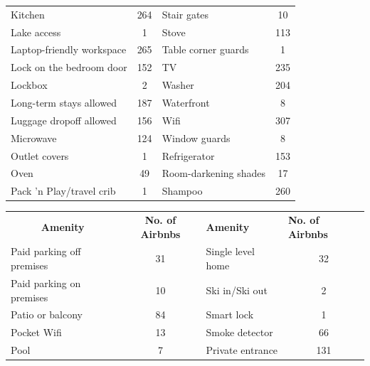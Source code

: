 \documentclass[a4paper, 12pt]{article}
\begin{document}
\begin{table}[htbp]
\begin{tabular}{p{10.285em}cp{10.285em}c}
    Kitchen & 264   & Stair gates & 10 \\
    Lake access & 1     & Stove & 113 \\
    Laptop-friendly workspace & 265   & Table corner guards & 1 \\
    Lock on the bedroom door & 152   & TV    & 235 \\
    Lockbox & 2     & Washer & 204 \\
    Long-term stays allowed & 187   & Waterfront & 8 \\
    Luggage dropoff allowed & 156   & Wifi  & 307 \\
    Microwave & 124   & Window guards & 8 \\
    Outlet covers & 1     & Refrigerator & 153 \\
    Oven  & 49    & Room-darkening shades & 17 \\
    Pack 'n Play/travel crib & 1     & Shampoo & 260 \\
    \end{tabular}%
  \label{tab:addlabel}%
\end{table}%

\begin{table}[htbp]
  \centering
    \begin{tabular}{p{10.285em}cp{10.285em}c}
    \multicolumn{1}{c}{\textbf{Amenity}} & \multicolumn{1}{p{8em}}{\textbf{No. of Airbnbs}} & \textbf{Amenity} & \multicolumn{1}{l}{\textbf{No. of Airbnbs}} \\

    Paid parking off premises & 31    & Single level home & 32 \\
    Paid parking on premises & 10    & Ski in/Ski out & 2 \\
    Patio or balcony & 84    & Smart lock & 1 \\
    Pocket Wifi & 13    & Smoke detector & 66 \\
    Pool  & 7     & Private entrance & 131 \\
    \end{tabular}%
  \label{tab:addlabel}%
\end{table}%
\end{document}

